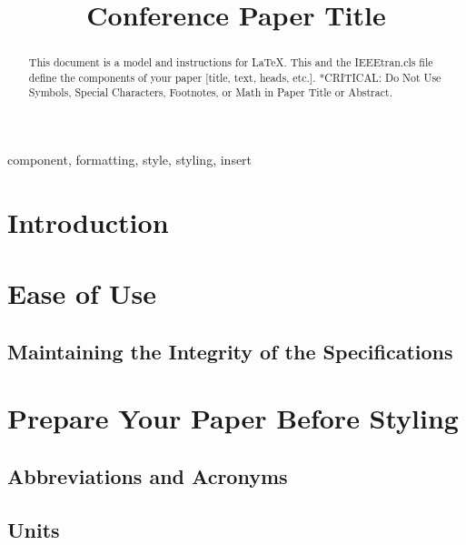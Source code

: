 \documentclass[conference]{IEEEtran}
\begin{document}
\title{Conference Paper Title
}

\author{
}

\maketitle

\begin{abstract}
    This document is a model and instructions for \LaTeX.
    This and the IEEEtran.cls file define the components of your paper [title, text, heads, etc.]. *CRITICAL: Do Not Use Symbols, Special Characters, Footnotes,
    or Math in Paper Title or Abstract.
\end{abstract}

\begin{IEEEkeywords}
    component, formatting, style, styling, insert
\end{IEEEkeywords}

\section{Introduction}

\section{Ease of Use}

\subsection{Maintaining the Integrity of the Specifications}

\section{Prepare Your Paper Before Styling}

\subsection{Abbreviations and Acronyms}

\subsection{Units}
\end{document}
